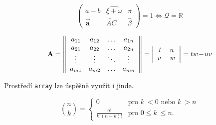 \documentclass[11pt,twocolumn,a4paper]{article}
\theoremstyle{definition}
\begin{document}
\begin{equation*}
    \left(
        \begin{array}{ccc} 
            a-b & \widehat{\xi+\omega} & \pi \\ 
            \vec{\mathbf{a}} & \overleftrightarrow{A C} & \hat{\beta} 
        \end{array}
    \right)
=1 \Longleftrightarrow \mathcal{Q}=\mathbb{R}
\end{equation*}

\begin{equation*}
\mathbf{A}=
\left\|
    \begin{array}{cccc}
        a_{11} & a_{12} & \ldots & a_{1 n} \\
        a_{21} & a_{22} & \ldots & a_{2 n} \\
        \vdots & \vdots & \ddots & \vdots \\
        a_{m 1} & a_{m 2} & \ldots & a_{m n}
    \end{array}
\right\|
=
\left|
    \begin{array}{cc}
    t & u\hspace{0.25em} \\
    v \hspace{0.25em} & w \\
    \end{array}
\right|
=t w\!-\!u v
\end{equation*}

Prostředí \texttt{array} lze úspěšně využít i jinde.

\begin{equation*}
\binom{n}{k} = 
\left\{
    \begin{array}{cl}
        0&\text{pro } k\ <0\text{ nebo } k\ >n \\
        \frac{n!}{k!(n-k)!}&\text{pro } 0 \leq k\ \leq n.
    \end{array}
\right.
\end{equation*}
\end{document}
